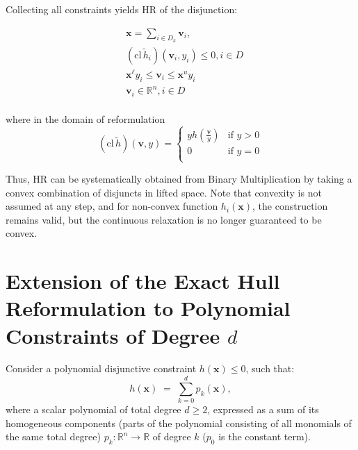 \documentclass[11pt]{article}
\begin{document}
\begin{appendices}
Collecting all constraints yields HR of the disjunction:

\begingroup
\begin{equation*}
\begin{aligned}
    & \mathbf{x} = \sum_{i \in D_k} \mathbf{v}_{i},\\
    & \left( \text{cl} \, \widetilde{h}_{i} \right)(\mathbf{v}_{i}, y_{i}) \leq 0, i \in D \\
    & \mathbf x^{\ell} y_{i} \leq \mathbf{v}_{i} \leq \mathbf{x}^u y_{i} \\
    & \mathbf{v}_{i} \in \mathbb{R}^n, i \in D\\
\end{aligned}
\end{equation*}
\endgroup

where in the domain of reformulation
\begingroup
\begin{equation*}
    \left( \text{cl} \, \widetilde{h} \right)(\mathbf{v}, y) = 
\begin{cases} 
    y h\left(\frac{\mathbf{v}}{y}\right) & \text{if } y > 0 \\[5pt]
    0  & \text{if } y = 0 \\[1pt]
\end{cases}
\end{equation*}
\endgroup




Thus, HR can be systematically obtained from Binary Multiplication by taking a convex combination of disjuncts in lifted space.
Note that convexity is not assumed at any step, and for non-convex function $h_i(\mathbf{x})$, the construction remains valid, but the continuous relaxation is no longer guaranteed to be convex.






\section{Extension of the Exact Hull Reformulation to Polynomial Constraints of Degree $d$}
\label{app:poly-hull}


Consider a polynomial disjunctive constraint \(h(\mathbf x) \leq 0\), such that:
\[
    h(\mathbf x)\;=\;\sum_{k=0}^{d} p_k(\mathbf x),
\]
where a scalar polynomial of total degree $d\ge 2$, expressed as a sum of its homogeneous components (parts of the polynomial consisting of all monomials of the same total degree)
$p_k:\mathbb R^{n}\!\to\!\mathbb R$ of degree $k$ ($p_0$ is the constant term).


\end{appendices}
\end{document}
